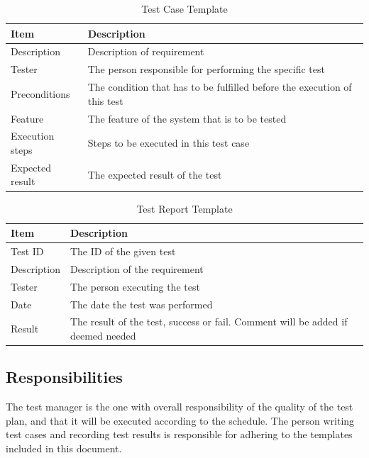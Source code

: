 \begin{table}
\caption{Test Case Template}
\centering
\begin{tabular}{ l l }
\hline
 Item            & Description                                                              \\ 
\hline
 Description     & Description of requirement                                               \\ 
 Tester          & The person responsible for performing the specific test                  \\ 
 Preconditions   & The condition that has to be fulfilled before the execution of this test \\ 
 Feature         & The feature of the system that is to be tested                           \\ 
 Execution steps & Steps to be executed in this test case                                   \\ 
 Expected result & The expected result of the test                                          \\
\hline
\end{tabular}
\label{table:testcase}
\end{table}

\begin{table}
\caption{Test Report Template}
\centering
\begin{tabular}{ l l }
\hline
Item        & Description                             \\ 
\hline
Test ID     & The ID of the given test                \\ 
Description & Description of the requirement          \\ 
Tester      & The person executing the test           \\ 
Date        & The date the test was performed         \\ 
Result      & The result of the test, success or fail. Comment will be added if deemed needed \\
\hline
\end{tabular}
\label{table:testreport}
\end{table}

\subsection{Responsibilities}
The test manager is the one with overall responsibility of the quality of the test plan, and that it will be executed according to the schedule. The person writing test cases and recording test results is responsible for adhering to the templates included in this document.


